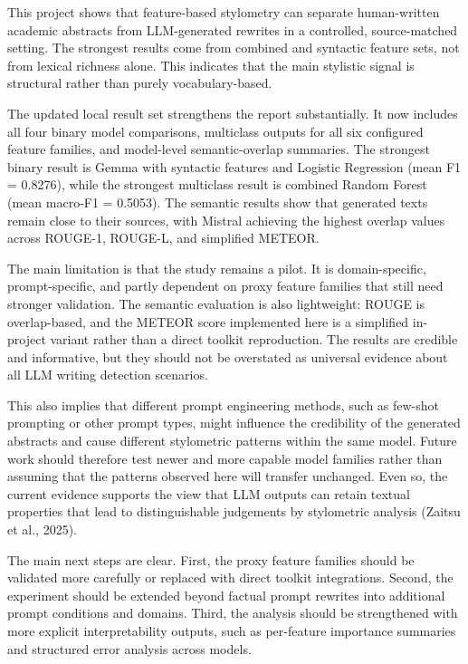 \documentclass[12pt,a4paper]{article}
\begin{document}
This project shows that feature-based stylometry can separate human-written academic abstracts from LLM-generated rewrites in a controlled, source-matched setting. The strongest results come from combined and syntactic feature sets, not from lexical richness alone. This indicates that the main stylistic signal is structural rather than purely vocabulary-based.

The updated local result set strengthens the report substantially. It now includes all four binary model comparisons, multiclass outputs for all six configured feature families, and model-level semantic-overlap summaries. The strongest binary result is Gemma with syntactic features and Logistic Regression (mean F1 = 0.8276), while the strongest multiclass result is combined Random Forest (mean macro-F1 = 0.5053). The semantic results show that generated texts remain close to their sources, with Mistral achieving the highest overlap values across ROUGE-1, ROUGE-L, and simplified METEOR.

The main limitation is that the study remains a pilot. It is domain-specific, prompt-specific, and partly dependent on proxy feature families that still need stronger validation. The semantic evaluation is also lightweight: ROUGE is overlap-based, and the METEOR score implemented here is a simplified in-project variant rather than a direct toolkit reproduction. The results are credible and informative, but they should not be overstated as universal evidence about all LLM writing detection scenarios.

This also implies that different prompt engineering methods, such as few-shot prompting or other prompt types, might influence the credibility of the generated abstracts and cause different stylometric patterns within the same model. Future work should therefore test newer and more capable model families rather than assuming that the patterns observed here will transfer unchanged. Even so, the current evidence supports the view that LLM outputs can retain textual properties that lead to distinguishable judgements by stylometric analysis (Zaitsu et al., 2025).

The main next steps are clear. First, the proxy feature families should be validated more carefully or replaced with direct toolkit integrations. Second, the experiment should be extended beyond factual prompt rewrites into additional prompt conditions and domains. Third, the analysis should be strengthened with more explicit interpretability outputs, such as per-feature importance summaries and structured error analysis across models.
\end{document}
